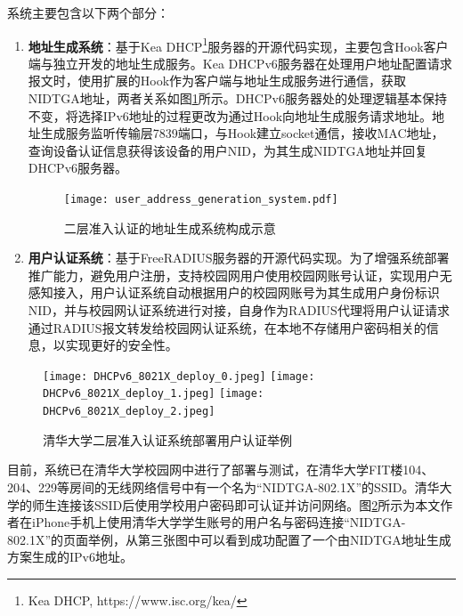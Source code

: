         系统主要包含以下两个部分：
        \begin{enumerate}[1{)}]
          \item \textbf{地址生成系统}：基于Kea DHCP\footnote{Kea DHCP, https://www.isc.org/kea/}服务器的开源代码实现，主要包含Hook客户端与独立开发的地址生成服务。Kea DHCPv6服务器在处理用户地址配置请求报文时，使用扩展的Hook作为客户端与地址生成服务进行通信，获取NIDTGA地址，两者关系如图\ref{fig:user_address_generation_system}所示。DHCPv6服务器处的处理逻辑基本保持不变，将选择IPv6地址的过程更改为通过Hook向地址生成服务请求地址。地址生成服务监听传输层7839端口，与Hook建立socket通信，接收MAC地址，查询设备认证信息获得该设备的用户NID，为其生成NIDTGA地址并回复DHCPv6服务器。
            \begin{figure}[ht]
              \centering
              \texttt{[image: user\_address\_generation\_system.pdf]}
              \caption{二层准入认证的地址生成系统构成示意}
              \label{fig:user_address_generation_system}
            \end{figure}
          \item \textbf{用户认证系统}：基于FreeRADIUS服务器的开源代码实现。为了增强系统部署推广能力，避免用户注册，支持校园网用户使用校园网账号认证，实现用户无感知接入，用户认证系统自动根据用户的校园网账号为其生成用户身份标识NID，并与校园网认证系统进行对接，自身作为RADIUS代理将用户认证请求通过RADIUS报文转发给校园网认证系统，在本地不存储用户密码相关的信息，以实现更好的安全性。
        \end{enumerate}
    
        \begin{figure}[ht]
          \centering
          {\texttt{[image: DHCPv6\_8021X\_deploy\_0.jpeg]}}
          \hspace{2em}
          {\texttt{[image: DHCPv6\_8021X\_deploy\_1.jpeg]}}
          \hspace{2em}
          {\texttt{[image: DHCPv6\_8021X\_deploy\_2.jpeg]}}
          \caption{清华大学二层准入认证系统部署用户认证举例}
          \label{fig:DHCPv6_8021X_deploy_result}
        \end{figure}
    
        目前，系统已在清华大学校园网中进行了部署与测试，在清华大学FIT楼104、204、229等房间的无线网络信号中有一个名为“NIDTGA-802.1X”的SSID。清华大学的师生连接该SSID后使用学校用户密码即可认证并访问网络。图\ref{fig:DHCPv6_8021X_deploy_result}所示为本文作者在iPhone手机上使用清华大学学生账号的用户名与密码连接“NIDTGA-802.1X”的页面举例，从第三张图中可以看到成功配置了一个由NIDTGA地址生成方案生成的IPv6地址。

